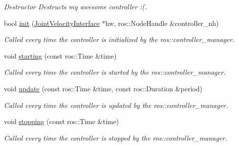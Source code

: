 \begin{DoxyCompactItemize}
\begin{DoxyCompactList}\small\item\em Destructor Destructs my awesome controller \-:(. \end{DoxyCompactList}\item 
bool \hyperlink{classhiqp_1_1ROSKinematicsController_a9acc590f4c514c1321f95f0667d1aae0}{init} (\hyperlink{namespacehiqp_ac536ca3b4ba33489281fa5bec490799c}{Joint\-Velocity\-Interface} $\ast$hw, ros\-::\-Node\-Handle \&controller\-\_\-nh)
\begin{DoxyCompactList}\small\item\em Called every time the controller is initialized by the ros\-::controller\-\_\-manager. \end{DoxyCompactList}\item 
void \hyperlink{classhiqp_1_1ROSKinematicsController_a216a9b24cbb343496614d027868af72e}{starting} (const ros\-::\-Time \&time)
\begin{DoxyCompactList}\small\item\em Called every time the controller is started by the ros\-::controller\-\_\-manager. \end{DoxyCompactList}\item 
void \hyperlink{classhiqp_1_1ROSKinematicsController_aa4cc3905801b4097916731d0d7af2089}{update} (const ros\-::\-Time \&time, const ros\-::\-Duration \&period)
\begin{DoxyCompactList}\small\item\em Called every time the controller is updated by the ros\-::controller\-\_\-manager. \end{DoxyCompactList}\item 
void \hyperlink{classhiqp_1_1ROSKinematicsController_a683aa002bcca543a308e2a8ab507cfa5}{stopping} (const ros\-::\-Time \&time)
\begin{DoxyCompactList}\small\item\em Called every time the controller is stopped by the ros\-::controller\-\_\-manager. \end{DoxyCompactList}\end{DoxyCompactItemize}


